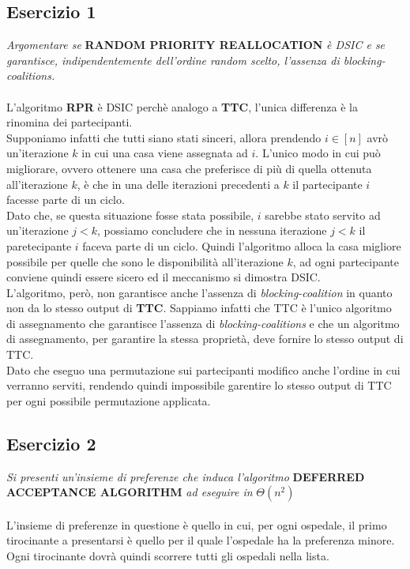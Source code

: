 \documentclass{article}
\begin{document}
        \subsection{Esercizio 1}
            \textit{Argomentare se} \textbf{RANDOM PRIORITY REALLOCATION} \textit{è DSIC e se garantisce, indipendentemente dell'ordine random scelto, l'assenza di blocking-coalitions.}\\
            \\
            L'algoritmo \textbf{RPR} è DSIC perchè analogo a \textbf{TTC}, l'unica differenza è la rinomina dei partecipanti.\\
            Supponiamo infatti che tutti siano stati sinceri, allora prendendo $ i \in [n] $ avrò un'iterazione $ k $ in cui una casa viene assegnata ad $ i $. L'unico modo in cui può migliorare, ovvero ottenere una casa che preferisce di più di quella ottenuta all'iterazione $ k $, è che in una delle iterazioni precedenti a $ k $ il partecipante $ i $ facesse parte di un ciclo.\\
            Dato che, se questa situazione fosse stata possibile, $ i $ sarebbe stato servito ad un'iterazione $ j < k $, possiamo concludere che in nessuna iterazione $ j < k $ il paretecipante $ i $ faceva parte di un ciclo. Quindi l'algoritmo alloca la casa migliore possibile per quelle che sono le disponibilità all'iterazione $ k $, ad ogni partecipante conviene quindi essere sicero ed il meccanismo si dimostra DSIC.\\
            L'algoritmo, però, non garantisce anche l'assenza di \textit{blocking-coalition} in quanto non da lo stesso output di \textbf{TTC}. Sappiamo infatti che TTC è l'unico algoritmo di assegnamento che garantisce l'assenza di \textit{blocking-coalitions} e che un algoritmo di assegnamento, per garantire la stessa proprietà, deve fornire lo stesso output di TTC.\\
            Dato che eseguo una permutazione sui partecipanti modifico anche l'ordine in cui verranno serviti, rendendo quindi impossibile garentire lo stesso output di TTC per ogni possibile permutazione applicata.
        \subsection{Esercizio 2}
            \textit{Si presenti un'insieme di preferenze che induca l'algoritmo} \textbf{DEFERRED ACCEPTANCE ALGORITHM} \textit{ad eseguire in} $ \Theta(n^2) $\\
            \\
            L'insieme di preferenze in questione è quello in cui, per ogni ospedale, il primo tirocinante a presentarsi è quello per il quale l'ospedale ha la preferenza minore.\\
            Ogni tirocinante dovrà quindi scorrere tutti gli ospedali nella lista.
        \newpage
\end{document}
